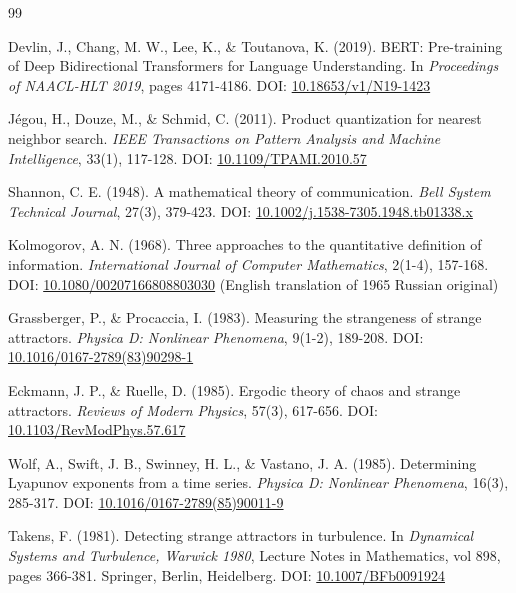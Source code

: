 \documentclass[11pt,a4paper]{article}
\begin{document}

\begin{thebibliography}{99}

Devlin, J., Chang, M. W., Lee, K., \& Toutanova, K. (2019).
BERT: Pre-training of Deep Bidirectional Transformers for Language Understanding.
In \textit{Proceedings of NAACL-HLT 2019}, pages 4171-4186.
DOI: \href{https://doi.org/10.18653/v1/N19-1423}{10.18653/v1/N19-1423}

J\'egou, H., Douze, M., \& Schmid, C. (2011).
Product quantization for nearest neighbor search.
\textit{IEEE Transactions on Pattern Analysis and Machine Intelligence}, 33(1), 117-128.
DOI: \href{https://doi.org/10.1109/TPAMI.2010.57}{10.1109/TPAMI.2010.57}

Shannon, C. E. (1948).
A mathematical theory of communication.
\textit{Bell System Technical Journal}, 27(3), 379-423.
DOI: \href{https://doi.org/10.1002/j.1538-7305.1948.tb01338.x}{10.1002/j.1538-7305.1948.tb01338.x}

Kolmogorov, A. N. (1968).
Three approaches to the quantitative definition of information.
\textit{International Journal of Computer Mathematics}, 2(1-4), 157-168.
DOI: \href{https://doi.org/10.1080/00207166808803030}{10.1080/00207166808803030}
(English translation of 1965 Russian original)

Grassberger, P., \& Procaccia, I. (1983).
Measuring the strangeness of strange attractors.
\textit{Physica D: Nonlinear Phenomena}, 9(1-2), 189-208.
DOI: \href{https://doi.org/10.1016/0167-2789(83)90298-1}{10.1016/0167-2789(83)90298-1}

Eckmann, J. P., \& Ruelle, D. (1985).
Ergodic theory of chaos and strange attractors.
\textit{Reviews of Modern Physics}, 57(3), 617-656.
DOI: \href{https://doi.org/10.1103/RevModPhys.57.617}{10.1103/RevModPhys.57.617}

Wolf, A., Swift, J. B., Swinney, H. L., \& Vastano, J. A. (1985).
Determining Lyapunov exponents from a time series.
\textit{Physica D: Nonlinear Phenomena}, 16(3), 285-317.
DOI: \href{https://doi.org/10.1016/0167-2789(85)90011-9}{10.1016/0167-2789(85)90011-9}

Takens, F. (1981).
Detecting strange attractors in turbulence.
In \textit{Dynamical Systems and Turbulence, Warwick 1980}, Lecture Notes in Mathematics, vol 898, pages 366-381.
Springer, Berlin, Heidelberg.
DOI: \href{https://doi.org/10.1007/BFb0091924}{10.1007/BFb0091924}


\end{thebibliography}
\end{document}
